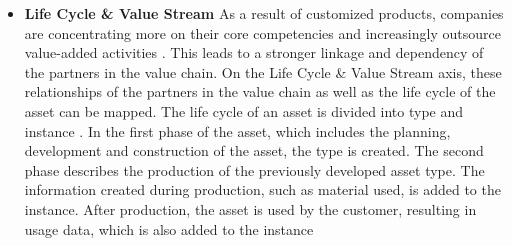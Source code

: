 \begin{itemize}
    \item[] \textbf{Life Cycle \& Value Stream} As a result of customized products, companies are concentrating more on their core competencies and increasingly outsource value-added activities \cite[p. 11]{Arnold2018DigitaleMittelstand}. This leads to a stronger linkage and dependency of the partners in the value chain. On the Life Cycle \& Value Stream axis, these relationships of the partners in the value chain as well as the life cycle of the asset can be mapped. The life cycle of an asset is divided into type and instance \cite[p. 43]{Heidel2017ReferenzarchitekturmodellIndustrie4.0Komponente}. In the first phase of the asset, which includes the planning, development and construction of the asset, the type is created. The second phase describes the production of the previously developed asset type. The information created during production, such as material used, is added to the instance. After production, the asset is used by the customer, resulting in usage data, which is also added to the instance \cite[p. 43]{Heidel2017ReferenzarchitekturmodellIndustrie4.0Komponente}

\end{itemize}
